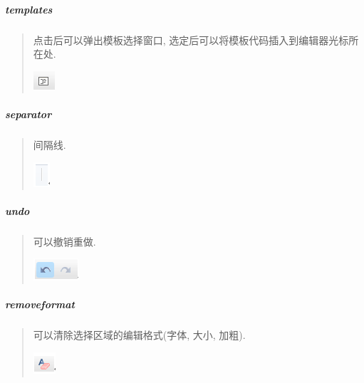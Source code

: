 \documentclass[letterpaper,10pt,english]{sphinxmanual}
\begin{document}
\subparagraph{templates}
\label{relatedproj/editorguide/plugin:templates}\begin{quote}

点击后可以弹出模板选择窗口, 选定后可以将模板代码插入到编辑器光标所在处.

\includegraphics{templates1.png}
\end{quote}


\subparagraph{separator}
\label{relatedproj/editorguide/plugin:separator}\begin{quote}

间隔线.

\includegraphics{separator1.png}
\end{quote}


\subparagraph{undo}
\label{relatedproj/editorguide/plugin:undo}\begin{quote}

可以撤销重做.

\includegraphics{undo1.png}
\end{quote}


\subparagraph{removeformat}
\label{relatedproj/editorguide/plugin:removeformat}\begin{quote}

可以清除选择区域的编辑格式(字体, 大小, 加粗).

\includegraphics{removeformat1.png}
\end{quote}
\end{document}
